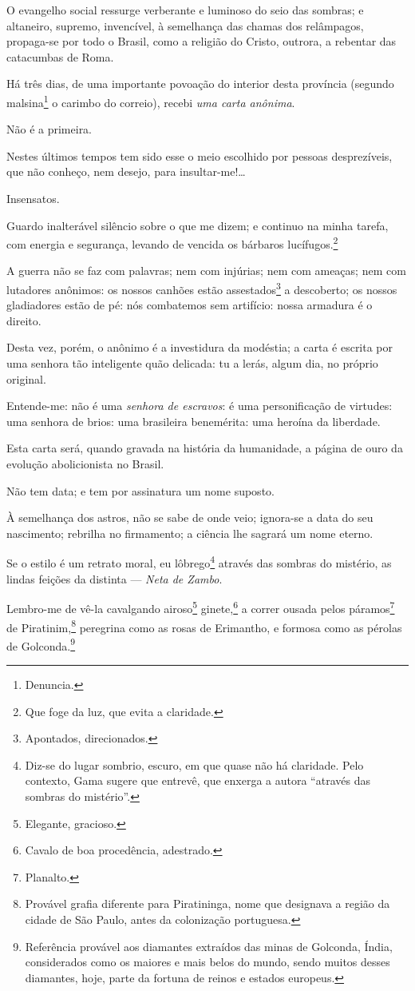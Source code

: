 O evangelho social ressurge verberante e luminoso do seio das sombras; e
altaneiro, supremo, invencível, à semelhança das chamas dos relâmpagos,
propaga-se por todo o Brasil, como a religião do Cristo, outrora, a
rebentar das catacumbas de Roma.

Há três dias, de uma importante povoação do interior desta província
(segundo malsina\footnote{Denuncia.} o carimbo do correio), recebi
\emph{uma carta anônima}.

Não é a primeira.

Nestes últimos tempos tem sido esse o meio escolhido por pessoas
desprezíveis, que não conheço, nem desejo, para insultar-me!\ldots{}

Insensatos.

Guardo inalterável silêncio sobre o que me dizem; e continuo na minha
tarefa, com energia e segurança, levando de vencida os bárbaros
lucífugos.\footnote{Que foge da luz, que evita a claridade.}

A guerra não se faz com palavras; nem com injúrias; nem com ameaças; nem
com lutadores anônimos: os nossos canhões estão assestados\footnote{
  Apontados, direcionados.} a descoberto; os nossos gladiadores estão de
pé: nós combatemos sem artifício: nossa armadura é o direito.

Desta vez, porém, o anônimo é a investidura da modéstia; a carta é
escrita por uma senhora tão inteligente quão delicada: tu a lerás, algum
dia, no próprio original.

Entende-me: não é uma \emph{senhora de escravos}: é uma personificação
de virtudes: uma senhora de brios: uma brasileira benemérita: uma
heroína da liberdade.

Esta carta será, quando gravada na história da humanidade, a página de
ouro da evolução abolicionista no Brasil.

Não tem data; e tem por assinatura um nome suposto.

À semelhança dos astros, não se sabe de onde veio; ignora-se a data do
seu nascimento; rebrilha no firmamento; a ciência lhe sagrará um nome
eterno.

Se o estilo é um retrato moral, eu lôbrego\footnote{Diz-se do lugar
  sombrio, escuro, em que quase não há claridade. Pelo contexto, Gama
  sugere que entrevê, que enxerga a autora ``através das sombras do
  mistério''.} através das sombras do mistério, as lindas feições da
distinta --- \emph{Neta de Zambo}.

Lembro-me de vê-la cavalgando airoso\footnote{Elegante, gracioso.}
ginete,\footnote{Cavalo de boa procedência, adestrado.} a correr
ousada pelos páramos\footnote{Planalto.} de Piratinim,\footnote{
  Provável grafia diferente para Piratininga, nome que designava a
  região da cidade de São Paulo, antes da colonização portuguesa.}
peregrina como as rosas de Erimantho, e formosa como as pérolas de
Golconda.\footnote{Referência provável aos diamantes extraídos das
  minas de Golconda, Índia, considerados como os maiores e mais belos do
  mundo, sendo muitos desses diamantes, hoje, parte da fortuna de reinos
  e estados europeus.}

